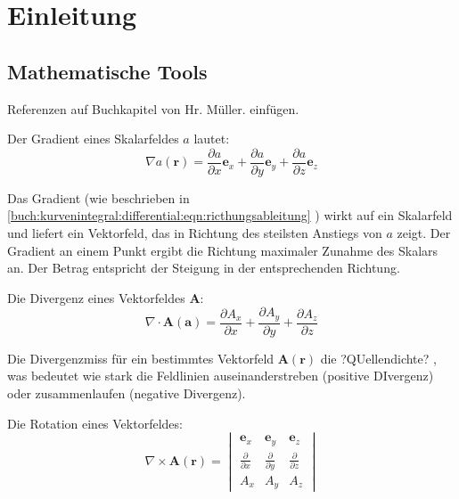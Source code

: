 %
%
%
%
\section{Einleitung\label{helmholtz:section:teil0}}

\subsection{Mathematische Tools}

Referenzen auf Buchkapitel von Hr. Müller. einfügen.

Der Gradient eines Skalarfeldes $a$ lautet:
\begin{equation}
\nabla a(\mathbf{r}) = \frac{\partial a}{\partial x}\mathbf{e}_x + \frac{\partial a}{\partial y}\mathbf{e}_y + \frac{\partial a}{\partial z}\mathbf{e}_z
\end{equation}

Das Gradient (wie beschrieben in  \eqref{buch:kurvenintegral:differential:eqn:ricthungsableitung} ) wirkt auf ein Skalarfeld und liefert ein Vektorfeld, das in Richtung des steilsten Anstiegs von $a$ zeigt. Der Gradient an einem Punkt ergibt die Richtung maximaler Zunahme des Skalars an. Der Betrag entspricht der Steigung in der entsprechenden Richtung. \newline


Die Divergenz eines Vektorfeldes $\mathbf{A}$:
\begin{equation}
\nabla \cdot \mathbf{A}(\mathbf{a}) = \frac{\partial A_x}{\partial x} + \frac{\partial A_y}{\partial y} + \frac{\partial A_z}{\partial z}
\end{equation}

Die Divergenzmiss für ein bestimmtes Vektorfeld $\mathbf{A}(\mathbf{r})$ die ?QUellendichte? , was bedeutet wie stark die Feldlinien auseinanderstreben (positive DIvergenz) oder zusammenlaufen (negative Divergenz). \newline


Die Rotation eines Vektorfeldes:
\begin{equation}
\nabla \times \mathbf{A}(\mathbf{r}) = \begin{vmatrix}
	\mathbf{e}_x & \mathbf{e}_y & \mathbf{e}_z \\
	\frac{\partial}{\partial x} & \frac{\partial}{\partial y} & \frac{\partial}{\partial z}\\
	A_x & A_y & A_z
\end{vmatrix}
\end{equation}


